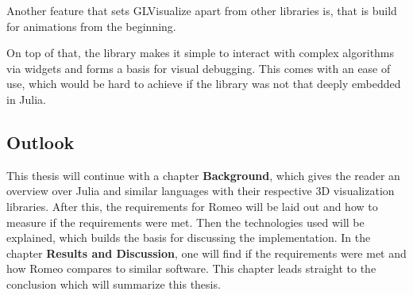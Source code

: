 Another feature that sets GLVisualize apart from other libraries is, that is build for animations from the beginning.

On top of that, the library makes it simple to interact with complex algorithms via widgets and forms a basis for visual debugging. 
This comes with an ease of use, which would be hard to achieve if the library was not that deeply embedded in Julia.


\subsection{Outlook}
This thesis will continue with a chapter \textbf{Background}, which gives the reader an overview over Julia and similar languages with their respective 3D visualization libraries.
After this, the requirements for Romeo will be laid out and how to measure if the requirements were met.
Then the technologies used will be explained, which builds the basis for discussing the implementation.
In the chapter \textbf{Results and Discussion}, one will find if the requirements were met and how Romeo compares to similar software.
This chapter leads straight to the conclusion which will summarize this thesis.


